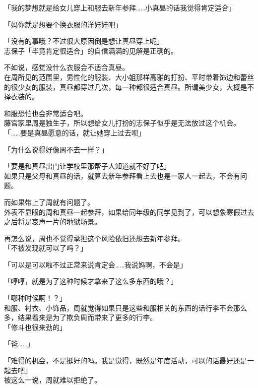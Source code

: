 「我的梦想就是给女儿穿上和服去新年参拜……小真昼的话我觉得肯定适合」

「妈你就是想要个换衣服的洋娃娃吧」

「没有的事哦？不过很大原因倒是想让真昼穿上呢」\\

志保子「毕竟肯定很适合」的自信满满的见解是正确的。

不如说，感觉没什么衣服会不适合真昼。\\

在周所见的范围里，男性化的服装、大小姐那样高雅的打扮、平时带着饰边和蕾丝的很少女的服装，真昼都穿过几次，每一种都很适合真昼。所谓美少女，大概是不择衣装的。

和服恐怕也会非常适合吧。\\

藤宫家里周是独生子，所以想给女儿打扮的志保子似乎是无法放过这个机会。\\

「……要是真昼愿意的话，就让她穿上过去呗」

「为什么说得好像周不去一样？」

「要是和真昼出门让学校里那帮子人知道就不好了吧」\\

如果只是父母和真昼的话，就算去新年参拜看上去也是一家人一起去，不会有问题。

而如果带上了周就有问题了。\\

外表不显眼的周和真昼一起参拜，如果给同年级的同学见到了，可以想象寒假过去之后将是哀声一片的地狱场景。

再怎么说，周也不觉得承担这个风险依旧还想去新年参拜。\\

「不被发现就可以了吗？」

「可以是可以啦不过正常来说肯定会……我说妈啊，不会是」

「哼哼，就是为了这种时候才拿来了这么多东西的哦？」

「哪种时候啊！？」\\

和服、衬衣、小饰品，周就觉得如果只是这些和服相关的东西的话行李不会那么多，结果看来是为了欺负周而带来了更多的行李。\\

「修斗也很来劲的」

「爸……」

「难得的机会，不是挺好的吗。我是觉得，既然是年度活动，可以的话最好还是一起去吧」\\

被这么一说，周就难以拒绝了。


